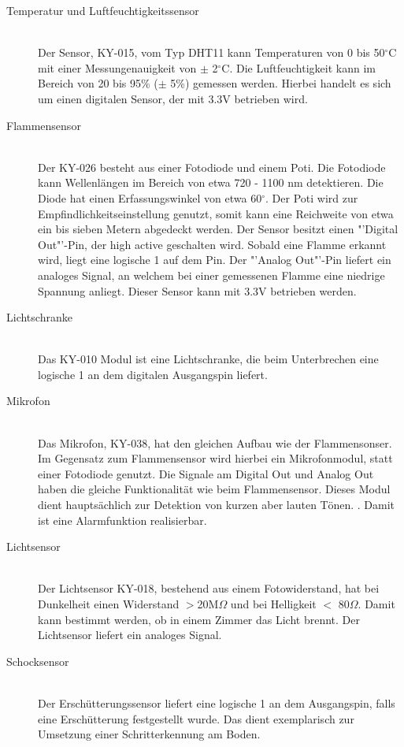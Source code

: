 \begin{description}
\item[Temperatur und Luftfeuchtigkeitssensor] \hfill \\
	Der Sensor, KY-015, vom Typ DHT11 kann Temperaturen von 0 bis 50$^\circ$C mit einer Messungenauigkeit von $\pm$ 2$^\circ$C. Die Luftfeuchtigkeit kann im Bereich von 20 bis 95\% ($\pm$ 5\%) gemessen werden. Hierbei handelt es sich um einen digitalen Sensor, der mit 3.3V betrieben wird.  
\item[Flammensensor]\hfill \\
	Der KY-026 besteht aus einer Fotodiode und einem \ac{Poti}. Die Fotodiode kann Wellenlängen im Bereich von etwa 720 - 1100 nm detektieren. Die Diode hat einen Erfassungswinkel von etwa 60$^\circ$. Der \ac{Poti} wird zur Empfindlichkeitseinstellung genutzt, somit kann eine Reichweite von etwa  ein bis sieben Metern abgedeckt werden. Der Sensor besitzt einen "'Digital Out"'-Pin, der high active geschalten wird. Sobald eine Flamme erkannt wird, liegt eine logische 1 auf dem Pin. Der "'Analog Out"'-Pin liefert ein analoges Signal, an welchem bei einer gemessenen Flamme eine niedrige Spannung anliegt. Dieser Sensor kann mit 3.3V betrieben werden.
\item[Lichtschranke]\hfill \\
	Das KY-010 Modul ist eine Lichtschranke, die beim Unterbrechen eine logische 1 an dem digitalen Ausgangspin liefert.
\item[Mikrofon]\hfill \\
	Das Mikrofon, KY-038, hat den gleichen Aufbau wie der Flammensonser. Im Gegensatz zum Flammensensor wird hierbei ein Mikrofonmodul, statt einer Fotodiode genutzt. Die Signale am Digital Out und Analog Out haben die gleiche Funktionalität wie beim Flammensensor. Dieses Modul dient hauptsächlich zur Detektion von kurzen aber lauten Tönen. %
	. Damit ist eine Alarmfunktion realisierbar.
\item[Lichtsensor]\hfill \\
	Der Lichtsensor KY-018, bestehend aus einem Fotowiderstand, hat bei Dunkelheit einen Widerstand $>$20M$\Omega$ und bei Helligkeit $<$ 80$\Omega$. Damit kann bestimmt werden, ob in einem Zimmer das Licht brennt. Der Lichtsensor liefert ein analoges Signal.
\item[Schocksensor]\hfill \\
	Der Erschütterungssensor liefert eine logische 1 an dem Ausgangspin, falls eine Erschütterung festgestellt wurde. Das dient exemplarisch zur Umsetzung einer Schritterkennung am Boden.
\end{description}